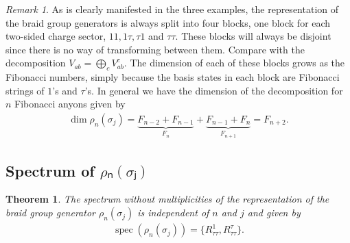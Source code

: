 \documentclass[a4paper,10pt,oneside]{book}
\theoremstyle{plain}
\newtheorem{theorem}{Theorem}[section]
\theoremstyle{definition}
\theoremstyle{remark}
\newtheorem{remark}{Remark}[section]
\begin{document}
\begin{remark}\label{remark:fibonacci sigma dimension}
  As is clearly manifested in the three examples, the representation of the braid group generators is always split into four blocks, one block for each two-sided charge sector, $11, 1τ, τ1$ and $ττ$. These blocks will always be disjoint since there is no way of transforming between them. Compare with the decomposition $V_{ab} = \bigoplus_c V_{ab}^c$. The dimension of each of these blocks grows as the Fibonacci numbers, simply because the basis states in each block are Fibonacci strings of $1$'s and $τ$'s. In general we have the dimension of the decomposition for $n$ Fibonacci anyons given by
  \begin{align*}
    \operatorname{dim} ρ_n (σ_j) = \underbrace{F_{n-2} + F_{n-1}}_{F_{n}} + \underbrace{F_{n-1} + F_{n}}_{F_{n+1}} = F_{n+2}.
  \end{align*}
\end{remark}







\subsection{Spectrum of $ρₙ(σⱼ)$}

\begin{theorem}
  The spectrum without multiplicities of the representation of the braid group generator $ρ_n(σ_j)$ is independent of $n$ and $j$ and given by
  \begin{align*}
    \operatorname{spec}(ρ_n(σ_j)) = \big\{ R_{\tau\tau}^1, R_{\tau\tau}^\tau \big\}.
  \end{align*}
\end{theorem}
\end{document}
